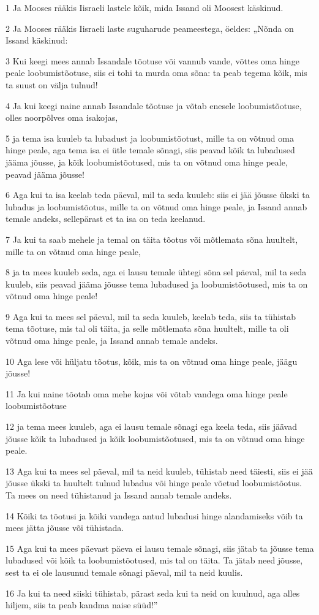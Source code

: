 \par 1 Ja Mooses rääkis Iisraeli lastele kõik, mida Issand oli Moosest käskinud.
\par 2 Ja Mooses rääkis Iisraeli laste suguharude peameestega, öeldes: „Nõnda on Issand käskinud:
\par 3 Kui keegi mees annab Issandale tõotuse või vannub vande, võttes oma hinge peale loobumistõotuse, siis ei tohi ta murda oma sõna: ta peab tegema kõik, mis ta suust on välja tulnud!
\par 4 Ja kui keegi naine annab Issandale tõotuse ja võtab enesele loobumistõotuse, olles noorpõlves oma isakojas,
\par 5 ja tema isa kuuleb ta lubadust ja loobumistõotust, mille ta on võtnud oma hinge peale, aga tema isa ei ütle temale sõnagi, siis peavad kõik ta lubadused jääma jõusse, ja kõik loobumistõotused, mis ta on võtnud oma hinge peale, peavad jääma jõusse!
\par 6 Aga kui ta isa keelab teda päeval, mil ta seda kuuleb: siis ei jää jõusse ükski ta lubadus ja loobumistõotus, mille ta on võtnud oma hinge peale, ja Issand annab temale andeks, sellepärast et ta isa on teda keelanud.
\par 7 Ja kui ta saab mehele ja temal on täita tõotus või mõtlemata sõna huultelt, mille ta on võtnud oma hinge peale,
\par 8 ja ta mees kuuleb seda, aga ei lausu temale ühtegi sõna sel päeval, mil ta seda kuuleb, siis peavad jääma jõusse tema lubadused ja loobumistõotused, mis ta on võtnud oma hinge peale!
\par 9 Aga kui ta mees sel päeval, mil ta seda kuuleb, keelab teda, siis ta tühistab tema tõotuse, mis tal oli täita, ja selle mõtlemata sõna huultelt, mille ta oli võtnud oma hinge peale, ja Issand annab temale andeks.
\par 10 Aga lese või hüljatu tõotus, kõik, mis ta on võtnud oma hinge peale, jäägu jõusse!
\par 11 Ja kui naine tõotab oma mehe kojas või võtab vandega oma hinge peale loobumistõotuse
\par 12 ja tema mees kuuleb, aga ei lausu temale sõnagi ega keela teda, siis jäävad jõusse kõik ta lubadused ja kõik loobumistõotused, mis ta on võtnud oma hinge peale.
\par 13 Aga kui ta mees sel päeval, mil ta neid kuuleb, tühistab need täiesti, siis ei jää jõusse ükski ta huultelt tulnud lubadus või hinge peale võetud loobumistõotus. Ta mees on need tühistanud ja Issand annab temale andeks.
\par 14 Kõiki ta tõotusi ja kõiki vandega antud lubadusi hinge alandamiseks võib ta mees jätta jõusse või tühistada.
\par 15 Aga kui ta mees päevast päeva ei lausu temale sõnagi, siis jätab ta jõusse tema lubadused või kõik ta loobumistõotused, mis tal on täita. Ta jätab need jõusse, sest ta ei ole lausunud temale sõnagi päeval, mil ta neid kuulis.
\par 16 Ja kui ta need siiski tühistab, pärast seda kui ta neid on kuulnud, aga alles hiljem, siis ta peab kandma naise süüd!”

